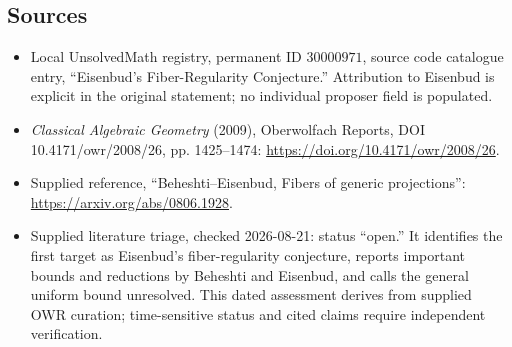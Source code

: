 \documentclass[11pt]{article}
\begin{document}
\subsection{Sources}
\begin{itemize}
\item Local UnsolvedMath registry, permanent ID \(30000971\), source code catalogue entry, ``Eisenbud's Fiber-Regularity Conjecture.'' Attribution to Eisenbud is explicit in the original statement; no individual proposer field is populated.
\item \emph{Classical Algebraic Geometry} (2009), Oberwolfach Reports, DOI 10.4171/owr/2008/26, pp. 1425--1474: \url{https://doi.org/10.4171/owr/2008/26}.
\item Supplied reference, ``Beheshti--Eisenbud, Fibers of generic projections'': \url{https://arxiv.org/abs/0806.1928}.
\item Supplied literature triage, checked 2026-08-21: status ``open.'' It identifies the first target as Eisenbud's fiber-regularity conjecture, reports important bounds and reductions by Beheshti and Eisenbud, and calls the general uniform bound unresolved. This dated assessment derives from supplied OWR curation; time-sensitive status and cited claims require independent verification.
\end{itemize}
\end{document}
